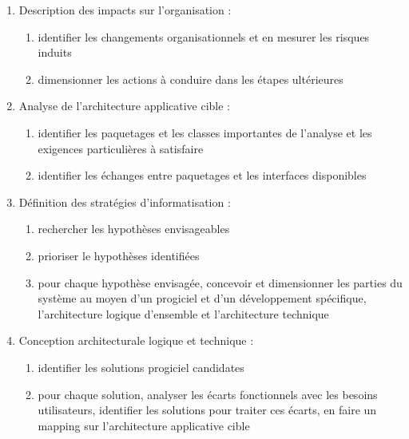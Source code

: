 \begin{enumerate}
          \begin{enumerate}
            \item Description des impacts sur l'organisation : 
                \begin{enumerate}
                  \item identifier les changements organisationnels et en mesurer les risques induits
                  \item dimensionner les actions à conduire dans les étapes ultérieures
                \end{enumerate}
            \item Analyse de l'architecture applicative cible : 
                \begin{enumerate}
                  \item identifier les paquetages et les classes importantes de l'analyse et les exigences particulières à satisfaire 
                  \item identifier les échanges entre paquetages et les interfaces disponibles 
                \end{enumerate}
            \item Définition des stratégies d'informatisation : 
                \begin{enumerate}
                  \item rechercher les hypothèses envisageables 
                  \item prioriser le hypothèses identifiées
                  \item pour chaque hypothèse envisagée, concevoir et dimensionner les parties du système au moyen d'un progiciel et d'un développement spécifique, l'architecture logique d'ensemble et l'architecture technique
                \end{enumerate}
            \item Conception architecturale logique et technique : 
                \begin{enumerate}
                  \item identifier les solutions progiciel candidates 
                  \item pour chaque solution, analyser les écarts fonctionnels avec les besoins utilisateurs, identifier les solutions pour traiter ces écarts, en faire un mapping sur l'architecture applicative cible
                \end{enumerate}
          \end{enumerate}


\end{enumerate}

